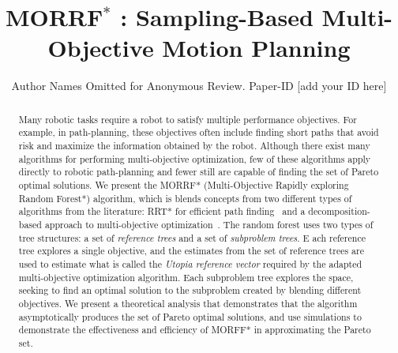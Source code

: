 \documentclass[conference]{IEEEtran}
\begin{document}
\title{ MORRF$^{*}$ : Sampling-Based Multi-Objective Motion Planning }

\author{Author Names Omitted for Anonymous Review. Paper-ID [add your ID here]}

\maketitle

\begin{abstract}
%

Many robotic tasks require a robot to satisfy multiple performance objectives.  
For example, in path-planning, these objectives often include finding short paths that avoid risk and maximize the information obtained by the robot.  
Although there exist many algorithms for performing multi-objective optimization, few of these algorithms apply directly to robotic path-planning and fewer still are capable of finding the set of Pareto optimal solutions.  
We present the MORRF* (Multi-Objective Rapidly exploring Random Forest*) algorithm, which is blends concepts from two different types of algorithms from the literature: RRT* for efficient path finding~\cite{Karaman.Frazzoli:RSS10} and a decomposition-based approach to multi-objective optimization~\cite{4358754}.  
The random forest uses two types of tree structures: a set of {\em reference trees} and a set of {\em subproblem trees}.  E
ach reference tree explores a single objective, and the estimates from the set of reference trees are used to estimate what is called the {\em Utopia reference vector} required by the adapted multi-objective optimization algorithm.  
Each subproblem tree explores the space, seeking to find an optimal solution to the subproblem created by blending different objectives.  
We present a theoretical analysis that demonstrates that the algorithm asymptotically produces the set of Pareto optimal solutions, and use simulations to demonstrate the effectiveness and efficiency of MORFF* in approximating the Pareto set.
\end{abstract}
\end{document}
